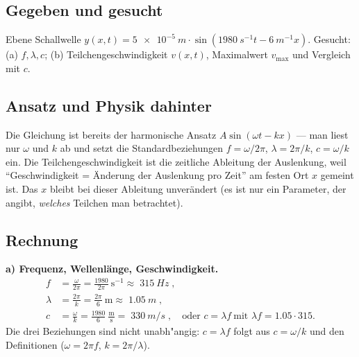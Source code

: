 
\subsection*{Gegeben und gesucht}
Ebene Schallwelle $y(x,t)=\qty{5e-5}{m}\cdot\sin(\qty{1980}{s^{-1}}t-\qty{6}{m^{-1}}x)$.
Gesucht: (a) $f,\lambda,c$; (b) Teilchengeschwindigkeit $v(x,t)$, Maximalwert
$v_{\max}$ und Vergleich mit $c$.

\subsection*{Ansatz und Physik dahinter}
Die Gleichung ist bereits der harmonische Ansatz $A\sin(\omega t-kx)$ --- man
liest nur $\omega$ und $k$ ab und setzt die Standardbeziehungen
$f=\omega/2\pi$, $\lambda=2\pi/k$, $c=\omega/k$ ein. Die
Teilchengeschwindigkeit ist die zeitliche Ableitung der Auslenkung, weil
``Geschwindigkeit = Änderung der Auslenkung pro Zeit'' am festen Ort $x$
gemeint ist. Das $x$ bleibt bei dieser Ableitung unverändert (es ist nur ein
Parameter, der angibt, \emph{welches} Teilchen man betrachtet).

\subsection*{Rechnung}
\textbf{a) Frequenz, Wellenlänge, Geschwindigkeit.}
\begin{align}
  f&=\frac{\omega}{2\pi}=\frac{1980}{2\pi}\ \mathrm{s^{-1}}
    \approx\boxed{\;\qty{315}{Hz}\;},\\
  \lambda&=\frac{2\pi}{k}=\frac{2\pi}{6}\ \mathrm{m}
    \approx\boxed{\;\qty{1.05}{m}\;},\\
  c&=\frac{\omega}{k}=\frac{1980}{6}\ \mathrm{\frac{m}{s}}
    =\boxed{\;\qty{330}{m/s}\;},
  \quad\text{oder } c=\lambda f\ \text{mit $\lambda f=1.05\cdot315$.}
\end{align}
Die drei Beziehungen sind nicht unabh"angig: $c=\lambda f$ folgt aus $c=\omega/k$
und den Definitionen ($\omega=2\pi f$, $k=2\pi/\lambda$).

